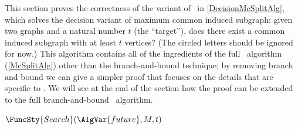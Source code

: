 This section proves the correctness of the variant of \McSplit\ in \cref{DecisionMcSplitAlg}, which solves
the decision variant of maximum common induced subgraph: given two graphs and a natural number
$t$ (the ``target''), does there exist a common induced subgraph with at least $t$ vertices?
(The circled letters should be ignored for now.)
This algorithm contains all of the ingredients of the full \McSplit\ algorithm (\cref{McSplitAlg})
other than the branch-and-bound technique; by removing branch and bound we can give a simpler
proof that focuses on the details that are specific to \McSplit.  We will see at the end of the section
how the proof can be extended to the full branch-and-bound \McSplit\ algorithm.

\begin{algorithm}[htb]
\AlgorithmFontSizeB
\DontPrintSemicolon
\nl $\FuncSty{Search}(\AlgVar{future},M,t)$ \;
\nl {}
\end{algorithm}
